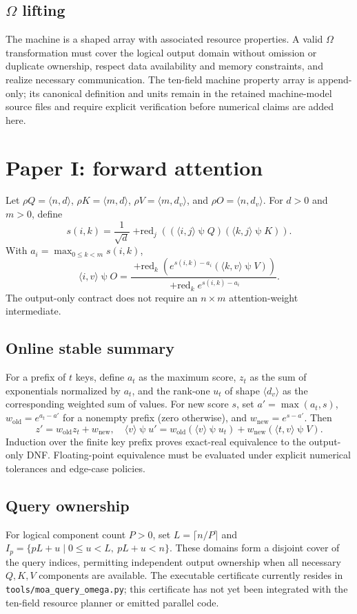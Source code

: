 \documentclass[11pt]{article}
\newcommand{\psisel}{\mathbin{\psi}}
\begin{document}
\subsection{$\Omega$ lifting}
The machine is a shaped array with associated resource properties. A valid $\Omega$ transformation must cover the logical output domain without omission or duplicate ownership, respect data availability and memory constraints, and realize necessary communication. The ten-field machine property array is append-only; its canonical definition and units remain in the retained machine-model source files and require explicit verification before numerical claims are added here.

\section{Paper I: forward attention}
Let $\rho Q=\langle n,d\rangle$, $\rho K=\langle m,d\rangle$, $\rho V=\langle m,d_v\rangle$, and $\rho O=\langle n,d_v\rangle$. For $d>0$ and $m>0$, define
\[
s(i,k)=\frac{1}{\sqrt d}\mathop{+red}\nolimits_j
((\langle i,j\rangle\psisel Q)(\langle k,j\rangle\psisel K)).
\]
With $a_i=\max_{0\le k<m}s(i,k)$,
\[
\langle i,v\rangle\psisel O=
\frac{\mathop{+red}\nolimits_k
\left(e^{s(i,k)-a_i}(\langle k,v\rangle\psisel V)\right)}
{\mathop{+red}\nolimits_k e^{s(i,k)-a_i}}.
\]
The output-only contract does not require an $n\times m$ attention-weight intermediate.

\subsection{Online stable summary}
For a prefix of $t$ keys, define $a_t$ as the maximum score, $z_t$ as the sum of exponentials normalized by $a_t$, and the rank-one $u_t$ of shape $\langle d_v\rangle$ as the corresponding weighted sum of values. For new score $s$, set $a'=\max(a_t,s)$, $w_{\mathrm{old}}=e^{a_t-a'}$ for a nonempty prefix (zero otherwise), and $w_{\mathrm{new}}=e^{s-a'}$. Then
\[
z'=w_{\mathrm{old}}z_t+w_{\mathrm{new}},\quad
\langle v\rangle\psisel u'=
w_{\mathrm{old}}(\langle v\rangle\psisel u_t)
+w_{\mathrm{new}}(\langle t,v\rangle\psisel V).
\]
Induction over the finite key prefix proves exact-real equivalence to the output-only DNF. Floating-point equivalence must be evaluated under explicit numerical tolerances and edge-case policies.

\subsection{Query ownership}
For logical component count $P>0$, set $L=\lceil n/P\rceil$ and
$I_p=\{pL+u\mid 0\le u<L,\ pL+u<n\}$. These domains form a disjoint cover of the query indices, permitting independent output ownership when all necessary $Q,K,V$ components are available. The executable certificate currently resides in \texttt{tools/moa\_query\_omega.py}; this certificate has not yet been integrated with the ten-field resource planner or emitted parallel code.
\end{document}
